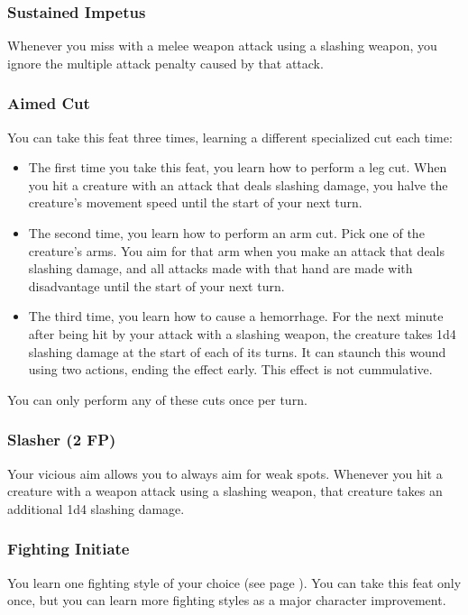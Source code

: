 \subsubsection{Sustained Impetus} \label{feat::sustainedimpetus}
    Whenever you miss with a melee weapon attack using a slashing weapon, you ignore the multiple attack penalty caused by that attack.
\subsubsection{Aimed Cut} \label{feat::aimedcut}
    You can take this feat three times, learning a different specialized cut each time:
    \begin{itemize}
        \item The first time you take this feat, you learn how to perform a leg cut.
        When you hit a creature with an attack that deals slashing damage, you halve the creature's movement speed until the start of your next turn.
        \item The second time, you learn how to perform an arm cut.
        Pick one of the creature's arms.
        You aim for that arm when you make an attack that deals slashing damage, and all attacks made with that hand are made with disadvantage until the start of your next turn.
        \item The third time, you learn how to cause a hemorrhage.
        For the next minute after being hit by your attack with a slashing weapon, the creature takes 1d4 slashing damage at the start of each of its turns.
        It can staunch this wound using two actions, ending the effect early.
        This effect is not cummulative.
    \end{itemize}

    You can only perform any of these cuts once per turn.
\subsubsection{Slasher (2 FP)} \label{feat::slasher}
    Your vicious aim allows you to always aim for weak spots.
    Whenever you hit a creature with a weapon attack using a slashing weapon, that creature takes an additional 1d4 slashing damage.

\subsubsection{Fighting Initiate} \label{feat::fightinginitiate}
    You learn one fighting style of your choice (see page \pageref{ssec::fightingstyles}).
    You can take this feat only once, but you can learn more fighting styles as a major character improvement.
